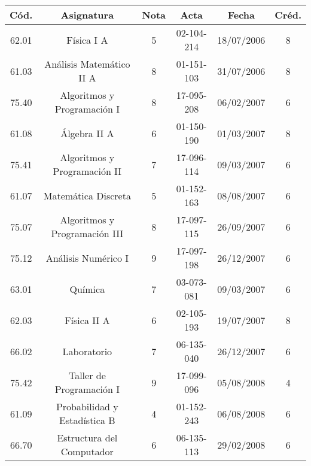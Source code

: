     \small{
        \begin{center}
        \hspace*{-1cm}
        \begin{tabular}{|c|c|c|c|c|c|}
            \hline
            \textbf{Cód.} & \textbf{Asignatura} & \textbf{Nota} & \textbf{Acta} & \textbf{Fecha} & \textbf{Créd.} \\ 
            \hline
            62.01 & Física I A                               & 5  & 02-104-214 & 18/07/2006 & 8 \\
            \hline
            61.03 & Análisis Matemático II A                 & 8  & 01-151-103 & 31/07/2006 & 8 \\
            \hline
            75.40 & Algoritmos y Programación I              & 8  & 17-095-208 & 06/02/2007 & 6 \\
            \hline
            61.08 & Álgebra II A                             & 6  & 01-150-190 & 01/03/2007 & 8 \\
            \hline
            75.41 & Algoritmos y Programación II             & 7  & 17-096-114 & 09/03/2007 & 6 \\
            \hline
            61.07 & Matemática Discreta                      & 5  & 01-152-163 & 08/08/2007 & 6 \\
            \hline
            75.07 & Algoritmos y Programación III            & 8  & 17-097-115 & 26/09/2007 & 6 \\
            \hline
            75.12 & Análisis Numérico I                      & 9  & 17-097-198 & 26/12/2007 & 6 \\
            \hline
            63.01 & Química                                  & 7  & 03-073-081 & 09/03/2007 & 6 \\
            \hline
            62.03 & Física II A                              & 6  & 02-105-193 & 19/07/2007 & 8 \\
            \hline
            66.02 & Laboratorio                              & 7  & 06-135-040 & 26/12/2007 & 6 \\
            \hline
            75.42 & Taller de Programación I                 & 9  & 17-099-096 & 05/08/2008 & 4 \\
            \hline
            61.09 & Probabilidad y Estadística B             & 4  & 01-152-243 & 06/08/2008 & 6 \\
            \hline
            66.70 & Estructura del Computador                & 6  & 06-135-113 & 29/02/2008 & 6 \\

\end{tabular}
\end{center}}
